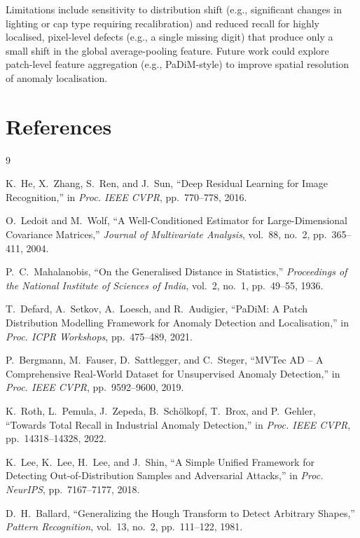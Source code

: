 Limitations include sensitivity to distribution shift (e.g., significant
changes in lighting or cap type requiring recalibration) and reduced recall
for highly localised, pixel-level defects (e.g., a single missing digit)
that produce only a small shift in the global average-pooling feature. Future
work could explore patch-level feature aggregation (e.g., PaDiM-style) to
improve spatial resolution of anomaly localisation.

\section*{References}

\begin{thebibliography}{9}

K.~He, X.~Zhang, S.~Ren, and J.~Sun,
``Deep Residual Learning for Image Recognition,''
in \textit{Proc. IEEE CVPR}, pp.~770--778, 2016.

O.~Ledoit and M.~Wolf,
``A Well-Conditioned Estimator for Large-Dimensional Covariance Matrices,''
\textit{Journal of Multivariate Analysis}, vol.~88, no.~2, pp.~365--411, 2004.

P.~C.~Mahalanobis,
``On the Generalised Distance in Statistics,''
\textit{Proceedings of the National Institute of Sciences of India},
vol.~2, no.~1, pp.~49--55, 1936.

T.~Defard, A.~Setkov, A.~Loesch, and R.~Audigier,
``PaDiM: A Patch Distribution Modelling Framework for Anomaly Detection and
Localisation,''
in \textit{Proc. ICPR Workshops}, pp.~475--489, 2021.

P.~Bergmann, M.~Fauser, D.~Sattlegger, and C.~Steger,
``MVTec AD -- A Comprehensive Real-World Dataset for Unsupervised Anomaly
Detection,''
in \textit{Proc. IEEE CVPR}, pp.~9592--9600, 2019.

K.~Roth, L.~Pemula, J.~Zepeda, B.~Schölkopf, T.~Brox, and P.~Gehler,
``Towards Total Recall in Industrial Anomaly Detection,''
in \textit{Proc. IEEE CVPR}, pp.~14318--14328, 2022.

K.~Lee, K.~Lee, H.~Lee, and J.~Shin,
``A Simple Unified Framework for Detecting Out-of-Distribution Samples and
Adversarial Attacks,''
in \textit{Proc. NeurIPS}, pp.~7167--7177, 2018.

D.~H.~Ballard,
``Generalizing the Hough Transform to Detect Arbitrary Shapes,''
\textit{Pattern Recognition}, vol.~13, no.~2, pp.~111--122, 1981.

\end{thebibliography}


